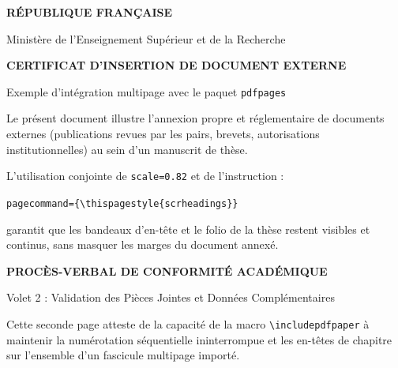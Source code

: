 \documentclass[a4paper,11pt]{article}
\begin{document}
\thispagestyle{empty}
\begin{center}
  \vspace*{1.5cm}
  {\LARGE\bfseries R\'EPUBLIQUE FRAN\c{C}AISE\par}
  \vspace{0.5cm}
  {\Large Minist\`ere de l'Enseignement Sup\'erieur et de la Recherche\par}
  \vspace{1.5cm}
  {\Large\bfseries CERTIFICAT D'INSERTION DE DOCUMENT EXTERNE\par}
  \vspace{0.5cm}
  {\large Exemple d'int\'egration multipage avec le paquet \texttt{pdfpages}\par}
\end{center}
\vspace{1.5cm}
\noindent Le pr\'esent document illustre l'annexion propre et r\'eglementaire de documents externes (publications revues par les pairs, brevets, autorisations institutionnelles) au sein d'un manuscrit de th\`ese.
\par\vspace{1cm}
\noindent L'utilisation conjointe de \texttt{scale=0.82} et de l'instruction :
\begin{center}
  \texttt{pagecommand=\{\textbackslash thispagestyle\{scrheadings\}\}}
\end{center}
garantit que les bandeaux d'en-t\^ete et le folio de la th\`ese restent visibles et continus, sans masquer les marges du document annex\'e.

\clearpage
\thispagestyle{empty}
\begin{center}
  \vspace*{1.5cm}
  {\Large\bfseries PROC\`ES-VERBAL DE CONFORMIT\'E ACAD\'EMIQUE\par}
  \vspace{0.5cm}
  {\large Volet 2 : Validation des Pi\`eces Jointes et Donn\'ees Compl\'ementaires\par}
\end{center}
\vspace{1.5cm}
\noindent Cette seconde page atteste de la capacit\'e de la macro \texttt{\textbackslash includepdfpaper} \`a maintenir la num\'erotation s\'equentielle ininterrompue et les en-t\^etes de chapitre sur l'ensemble d'un fascicule multipage import\'e.
\end{document}
